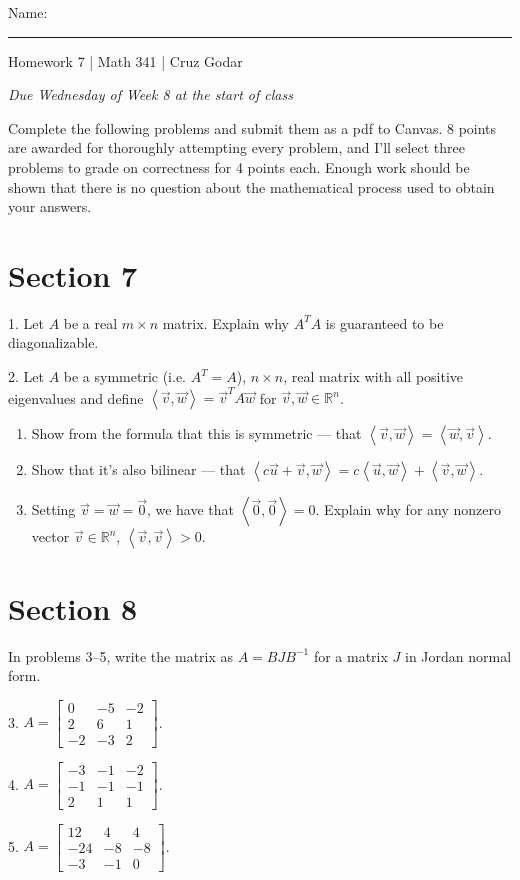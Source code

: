 \documentclass{article}
\begin{document}
\Large Name: \rule{2in}{0.15mm} \hfill Homework 7 | Math 341 | Cruz Godar \vspace{4pt} \normalsize

\textit{Due Wednesday of Week 8 at the start of class}

Complete the following problems and submit them as a pdf to Canvas. 8 points are awarded for thoroughly attempting every problem, and I'll select three problems to grade on correctness for 4 points each. Enough work should be shown that there is no question about the mathematical process used to obtain your answers.

\section{Section 7}

1. Let $A$ be a real $m \times n$ matrix. Explain why $A^T\!A$ is guaranteed to be diagonalizable.

2. Let $A$ be a symmetric (i.e. $A^T = A$), $n \times n$, real matrix with all positive eigenvalues and define $\left< \vec{v}, \vec{w} \right> = \vec{v}^T A \vec{w}$ for $\vec{v}, \vec{w} \in \mathbb{R}^n$.

\begin{enumerate}

	\item Show from the formula that this is symmetric --- that $\left< \vec{v}, \vec{w} \right> = \left< \vec{w}, \vec{v} \right>$.

	\item Show that it's also bilinear --- that $\left< c\vec{u} + \vec{v}, \vec{w} \right> = c\left< \vec{u}, \vec{w} \right> + \left< \vec{v}, \vec{w} \right>$.

	\item Setting $\vec{v} = \vec{w} = \vec{0}$, we have that $\left< \vec{0}, \vec{0} \right> = 0$. Explain why for any nonzero vector $\vec{v} \in \mathbb{R}^n$, $\left< \vec{v}, \vec{v} \right> > 0$.

\end{enumerate}

\section{Section 8}

In problems 3--5, write the matrix as $A = BJB^{-1}$ for a matrix $J$ in Jordan normal form.

3. $A = \left[\begin{array}{ccc} 0& -5& -2 \\ 2& 6& 1 \\ -2& -3& 2 \end{array}\right]$.

4. $A = \left[\begin{array}{ccc} -3& -1& -2 \\ -1& -1& -1 \\ 2& 1& 1 \end{array}\right]$.

5. $A = \left[\begin{array}{ccc} 12& 4& 4 \\ -24& -8& -8 \\ -3& -1& 0 \end{array}\right]$.
\end{document}
